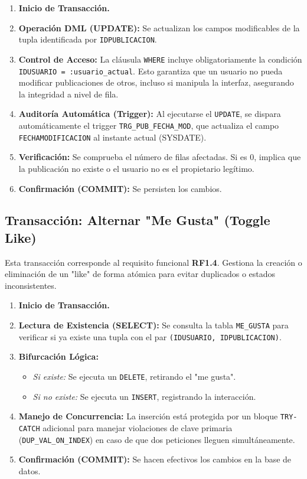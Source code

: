 \begin{enumerate}
    \item \textbf{Inicio de Transacción.}
    \item \textbf{Operación DML (UPDATE):} Se actualizan los campos modificables de la tupla identificada por \texttt{IDPUBLICACION}.
    \item \textbf{Control de Acceso:} La cláusula \texttt{WHERE} incluye obligatoriamente la condición \texttt{IDUSUARIO = :usuario\_actual}. Esto garantiza que un usuario no pueda modificar publicaciones de otros, incluso si manipula la interfaz, asegurando la integridad a nivel de fila.
    \item \textbf{Auditoría Automática (Trigger):} Al ejecutarse el \texttt{UPDATE}, se dispara automáticamente el trigger \texttt{TRG\_PUB\_FECHA\_MOD}, que actualiza el campo \texttt{FECHAMODIFICACION} al instante actual (SYSDATE).
    \item \textbf{Verificación:} Se comprueba el número de filas afectadas. Si es 0, implica que la publicación no existe o el usuario no es el propietario legítimo.
    \item \textbf{Confirmación (COMMIT):} Se persisten los cambios.
\end{enumerate}

\subsection{Transacción: Alternar "Me Gusta" (Toggle Like)}
Esta transacción corresponde al requisito funcional \textbf{RF1.4}. Gestiona la creación o eliminación de un "like" de forma atómica para evitar duplicados o estados inconsistentes.

\begin{enumerate}
    \item \textbf{Inicio de Transacción.}
    \item \textbf{Lectura de Existencia (SELECT):} Se consulta la tabla \texttt{ME\_GUSTA} para verificar si ya existe una tupla con el par \texttt{(IDUSUARIO, IDPUBLICACION)}.
    \item \textbf{Bifurcación Lógica:}
    \begin{itemize}
        \item \textit{Si existe:} Se ejecuta un \texttt{DELETE}, retirando el "me gusta".
        \item \textit{Si no existe:} Se ejecuta un \texttt{INSERT}, registrando la interacción.
    \end{itemize}
    \item \textbf{Manejo de Concurrencia:} La inserción está protegida por un bloque \texttt{TRY-CATCH} adicional para manejar violaciones de clave primaria (\texttt{DUP\_VAL\_ON\_INDEX}) en caso de que dos peticiones lleguen simultáneamente.
    \item \textbf{Confirmación (COMMIT):} Se hacen efectivos los cambios en la base de datos.
\end{enumerate}

